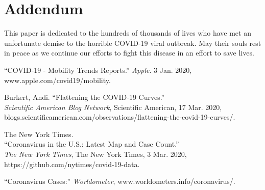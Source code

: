 \documentclass[11pt, english]{article}
\begin{document}
\section*{Addendum}
This paper is dedicated to the hundreds of thousands of lives who have met an unfortunate demise to the horrible COVID-19 viral outbreak. May their souls rest in peace as we continue our efforts to fight this disease in an effort to save lives.
\newpage
\begin{thebibliography}{9}

``COVID‑19 - Mobility Trends Reports.'' \textit{Apple}. 3 Jan. 2020,\\ www.apple.com/covid19/mobility.

Burkert, Andi. ``Flattening the COVID-19 Curves.''\\\textit{Scientific American Blog Network}, Scientific American, 17 Mar. 2020,\\ blogs.scientificamerican.com/observations/flattening-the-covid-19-curves/.

The New York Times.\\``Coronavirus in the U.S.: Latest Map and Case Count.''\\
\textit{The New York Times}, The New York Times, 3 Mar. 2020,\\ https://github.com/nytimes/covid-19-data.

“Coronavirus Cases:” \textit{Worldometer}, www.worldometers.info/coronavirus/.

\end{thebibliography}
\end{document}
